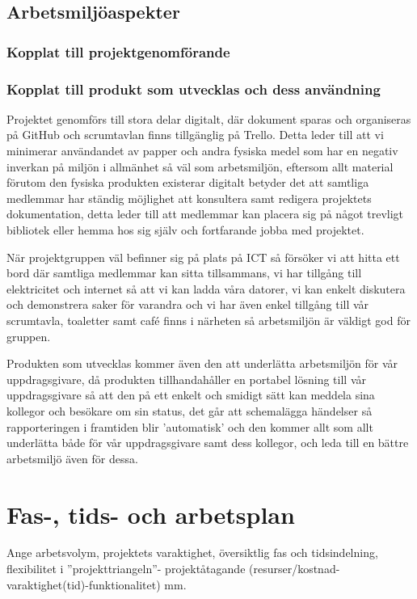 \documentclass[11pt]{article}
\begin{document}
\subsection{Arbetsmiljöaspekter}
\label{sec:org1d94873}
\subsubsection{Kopplat till projektgenomförande}
\label{sec:orga6c278e}

\subsubsection{Kopplat till produkt som utvecklas och dess användning}
\label{sec:org3a9f28c}

Projektet genomförs till stora delar digitalt, där dokument sparas
och organiseras på GitHub och scrumtavlan finns tillgänglig på
Trello. Detta leder till att vi minimerar användandet av papper och
andra fysiska medel som har en negativ inverkan på miljön i allmänhet
så väl som arbetsmiljön, eftersom allt material förutom den fysiska
produkten existerar digitalt betyder det att samtliga medlemmar har
ständig möjlighet att konsultera samt redigera projektets
dokumentation, detta leder till att medlemmar kan placera sig på
något trevligt bibliotek eller hemma hos sig själv och fortfarande
jobba med projektet.

När projektgruppen väl befinner sig på plats på ICT så försöker vi
att hitta ett bord där samtliga medlemmar kan sitta tillsammans, vi
har tillgång till elektricitet och internet så att vi kan ladda våra
datorer, vi kan enkelt diskutera och demonstrera saker för varandra
och vi har även enkel tillgång till vår scrumtavla, toaletter samt
café finns i närheten så arbetsmiljön är väldigt god för gruppen.

Produkten som utvecklas kommer även den att underlätta arbetsmiljön
för vår uppdragsgivare, då produkten tillhandahåller en portabel
lösning till vår uppdragsgivare så att den på ett enkelt och smidigt
sätt kan meddela sina kollegor och besökare om sin status, det går
att schemalägga händelser så rapporteringen i framtiden blir
'automatisk' och den kommer allt som allt underlätta både för vår
uppdragsgivare samt dess kollegor, och leda till en bättre
arbetsmiljö även för dessa.

\section{Fas-, tids- och arbetsplan}
\label{sec:org2bb3bf1}
Ange arbetsvolym, projektets varaktighet, översiktlig fas och
tidsindelning, flexibilitet i ”projekttriangeln”- projektåtagande
(resurser/kostnad-varaktighet(tid)-funktionalitet) mm.
\end{document}
